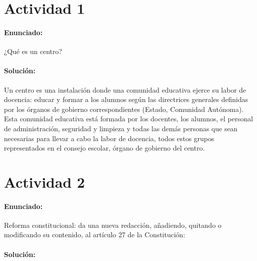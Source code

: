 
\section*{Actividad 1}
\paragraph{Enunciado: }
¿Qué es un centro?
\paragraph{Solución: }

Un centro es una instalación donde una comunidad educativa ejerce su labor de docencia: educar y formar a los alumnos según las directrices generales definidas por los órganos de gobierno correspondientes (Estado, Comunidad Autónoma). 
%
Esta comunidad educativa está formada por los docentes, los alumnos, el personal de administración, seguridad y limpieza y todas las demás personas que sean necesarias para llevar a cabo la labor de docencia, todos estos grupos representados en el consejo escolar, órgano de gobierno del centro.

\newpage
\section*{Actividad 2}
\paragraph{Enunciado: }
Reforma constitucional: da una nueva redacción, añadiendo, quitando o modificando su contenido, al artículo 27 de la Constitución:
\paragraph{Solución: }

